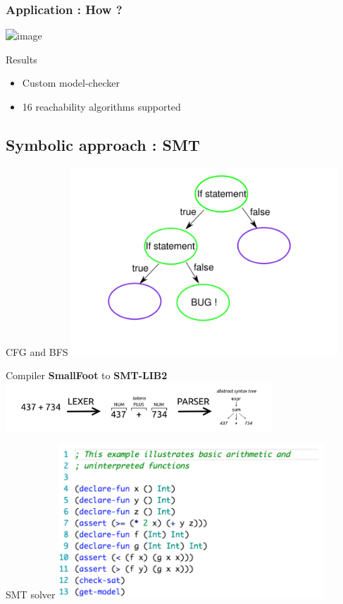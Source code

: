 \documentclass{beamer}
\begin{document}
\begin{frame}
\frametitle{Application : How ? }

\includegraphics<2>[width=\textwidth]{Figures/slide_mc.png}

\begin{block}{Results}
\begin{itemize}
\item Custom model-checker
\item 16 reachability algorithms supported
\end{itemize}
\end{block}

\end{frame}





\subsection{Symbolic approach : SMT }
\begin{frame}{CFG and BFS}
\includegraphics[width=10cm]{Figures/SMTsolver/CFG.png}

\end{frame}

\begin{frame}{Compiler}
\textbf{SmallFoot} to \textbf{SMT-LIB2}
\includegraphics[width=10cm]{Figures/SMTsolver/Image_PARSER_LEXER.png}

\end{frame}

\begin{frame}{SMT solver}
\includegraphics[width=10cm]{Figures/SMTsolver/SAT_SMTLIB.png}
\end{frame}
\end{document}
